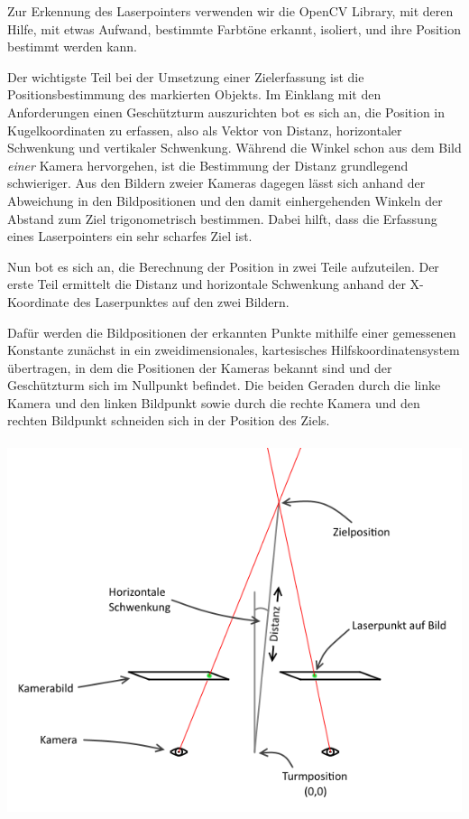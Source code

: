 \documentclass[12pt,a4paper]{article}
\begin{document}
Zur Erkennung des Laserpointers verwenden wir die OpenCV Library, mit deren Hilfe, mit etwas Aufwand, bestimmte Farbtöne erkannt, isoliert, und ihre Position bestimmt werden kann.

Der wichtigste Teil bei der Umsetzung einer Zielerfassung ist die Positionsbestimmung des markierten Objekts.
Im Einklang mit den Anforderungen einen Geschützturm auszurichten bot es sich an, die Position in Kugelkoordinaten zu erfassen, also als Vektor von Distanz, horizontaler Schwenkung und vertikaler Schwenkung.
Während die Winkel schon aus dem Bild \textit{einer} Kamera hervorgehen, ist die Bestimmung der Distanz grundlegend schwieriger. Aus den Bildern zweier Kameras dagegen lässt sich anhand der Abweichung in den Bildpositionen und den damit einhergehenden Winkeln der Abstand zum Ziel trigonometrisch bestimmen. Dabei hilft, dass die Erfassung eines Laserpointers ein sehr scharfes Ziel ist.

Nun bot es sich an, die Berechnung der Position in zwei Teile aufzuteilen. Der erste Teil ermittelt die Distanz und horizontale Schwenkung anhand der X-Koordinate des Laserpunktes auf den zwei Bildern.

Dafür werden die Bildpositionen der erkannten Punkte mithilfe einer gemessenen Konstante zunächst in ein zweidimensionales,  kartesisches Hilfskoordinatensystem übertragen, in dem die Positionen der Kameras bekannt sind und der Geschützturm sich im Nullpunkt befindet. Die beiden Geraden durch die linke Kamera und den linken Bildpunkt sowie durch die rechte Kamera und den rechten Bildpunkt schneiden sich in der Position des Ziels.
\hfill\\
\hfill\\
\includegraphics[scale=0.85]{../Bilder/PosBestGraph.png} 
\end{document}
